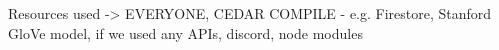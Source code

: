 Resources used -> EVERYONE, CEDAR COMPILE
  - e.g. Firestore, Stanford GloVe model, if we used any APIs, discord, node modules
